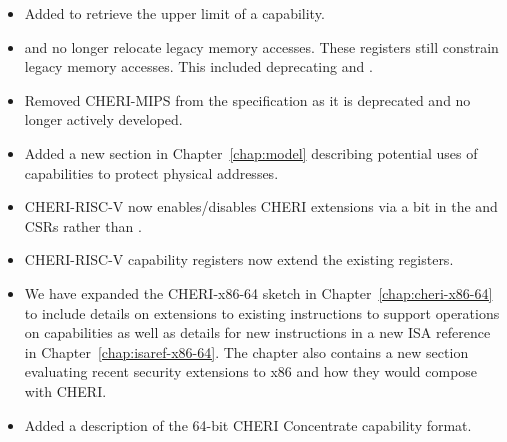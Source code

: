 \begin{itemize}
\item Added  to retrieve the upper limit of a
  capability.

\item \DDC{} and \PCC{} no longer relocate legacy memory accesses.
  These registers still constrain legacy memory accesses.  This
  included deprecating  and .

\item Removed CHERI-MIPS from the specification as it is deprecated
  and no longer actively developed.

\item Added a new section in Chapter~\ref{chap:model} describing
  potential uses of capabilities to protect physical addresses.

\item CHERI-RISC-V now enables/disables CHERI extensions via a bit in
  the \menvcfg{} and \senvcfg{} CSRs rather than \xccsr{}.

\item CHERI-RISC-V \xScratchC{} capability registers now extend the
  existing \xscratch{} registers.

\item We have expanded the CHERI-x86-64 sketch in
  Chapter~\ref{chap:cheri-x86-64} to include details on extensions to
  existing instructions to support operations on capabilities as well
  as details for new instructions in a new ISA reference in
  Chapter~\ref{chap:isaref-x86-64}.  The chapter also contains a new
  section evaluating recent security extensions to x86 and how they
  would compose with CHERI.

\item Added a description of the 64-bit CHERI Concentrate capability
  format.
\end{itemize}

